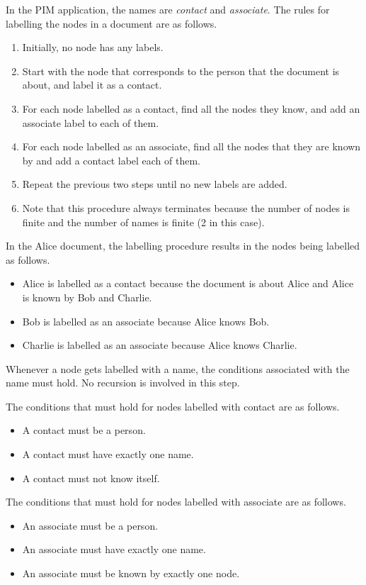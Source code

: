 \documentclass{article}
\begin{document}
In the PIM application, the names are {\em contact} and {\em associate}. 
The rules for labelling the nodes in a document are as follows.
\begin{enumerate}
\item Initially, no node has any labels.
\item Start with the node that corresponds to the person that the document is about, and label it as a contact.
\item For each node labelled as a contact, find all the nodes they know, and add an associate label to each of them.
\item For each node labelled as an associate, find all the nodes that they are known by and add a contact label each of them.
\item Repeat the previous two steps until no new labels are added.
\item Note that this procedure always terminates because the number of nodes is finite and the number of names is finite (2 in this case).
\end{enumerate}

In the Alice document, the labelling procedure results in the nodes being labelled as follows.
\begin{itemize}
\item Alice is labelled as a contact because the document is about Alice and Alice is known by Bob and Charlie.
\item Bob is labelled as an associate because Alice knows Bob.
\item Charlie is labelled as an associate because Alice knows Charlie.
\end{itemize}

Whenever a node gets labelled with a name, the conditions associated with the name must hold.
No recursion is involved in this step.

The conditions that must hold for nodes labelled with contact are as follows.
\begin{itemize}
\item A contact must be a person.
\item A contact must have exactly one name.
\item A contact must not know itself.
\end{itemize}

The conditions that must hold for nodes labelled with associate are as follows.
\begin{itemize}
\item An associate must be a person.
\item An associate must have exactly one name.
\item An associate must be known by exactly one node.
\end{itemize}
\end{document}
